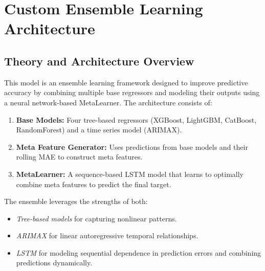 

\section{Custom Ensemble Learning Architecture}

\subsection{Theory and Architecture Overview}

This model is an ensemble learning framework designed to improve predictive accuracy by combining multiple base regressors and modeling their outputs using a neural network-based MetaLearner. The architecture consists of:

\begin{enumerate}
    \item \textbf{Base Models:} Four tree-based regressors (XGBoost, LightGBM, CatBoost, RandomForest) and a time series model (ARIMAX).
    \item \textbf{Meta Feature Generator:} Uses predictions from base models and their rolling MAE to construct meta features.
    \item \textbf{MetaLearner:} A sequence-based LSTM model that learns to optimally combine meta features to predict the final target.
\end{enumerate}

The ensemble leverages the strengths of both:
\begin{itemize}
    \item \textit{Tree-based models} for capturing nonlinear patterns.
    \item \textit{ARIMAX} for linear autoregressive temporal relationships.
    \item \textit{LSTM} for modeling sequential dependence in prediction errors and combining predictions dynamically.
\end{itemize}

